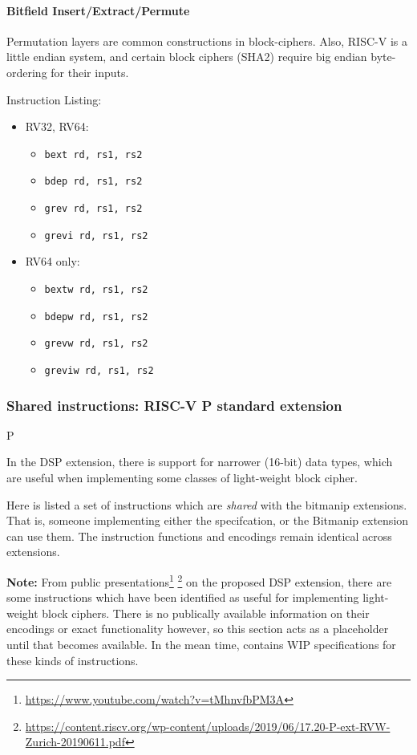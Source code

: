 \paragraph{Bitfield Insert/Extract/Permute}
Permutation layers are common constructions in block-ciphers.
Also, RISC-V is a little endian system, and certain block ciphers (SHA2)
require big endian byte-ordering for their inputs.

Instruction Listing:
\begin{itemize}
\item RV32, RV64:
\begin{itemize}
\item {\tt bext   rd, rs1, rs2}
\item {\tt bdep   rd, rs1, rs2}
\item {\tt grev   rd, rs1, rs2}
\item {\tt grevi  rd, rs1, rs2}
\end{itemize}
\item RV64 only:
\begin{itemize}
\item {\tt bextw  rd, rs1, rs2}
\item {\tt bdepw  rd, rs1, rs2}
\item {\tt grevw  rd, rs1, rs2}
\item {\tt greviw rd, rs1, rs2}
\end{itemize}
\end{itemize}


\subsubsection{Shared instructions: RISC-V P standard extension}
\label{sec:spec:instruction:P}


P~\cite[Chapter 20]{SCARV:RV:ISA:II}

In the DSP extension, there is support for narrower (16-bit)
data types, which are useful when implementing some classes of
light-weight block cipher.

Here is listed a set of instructions which are {\em shared} with
the bitmanip extensions.
That is, someone implementing either the \XCRYPTO specifcation, or
the Bitmanip extension can use them.
The instruction functions and encodings remain identical across extensions.


{\bf Note:} From public presentations\footnote{
\url{https://www.youtube.com/watch?v=tMhnvfbPM3A}
}
\footnote{
\url{https://content.riscv.org/wp-content/uploads/2019/06/17.20-P-ext-RVW-Zurich-20190611.pdf}
}
on the proposed DSP
extension, there are some instructions which have been identified as
useful for implementing light-weight block ciphers.
There is no publically available information on their encodings
or exact functionality however, so this section acts as a placeholder
until that becomes available.
In the mean time,
contains WIP specifications for these kinds of instructions.


